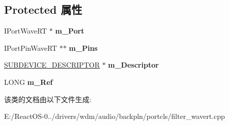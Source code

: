 \subsection*{Protected 属性}
\begin{DoxyCompactItemize}
\item 
\mbox{\label{class_c_port_filter_wave_r_t_ab103555c9e928d8d0c645bfbede5e2fc}} 
I\+Port\+Wave\+RT $\ast$ {\bfseries m\+\_\+\+Port}
\item 
\mbox{\label{class_c_port_filter_wave_r_t_a0356a06f89e7e1bb258ed621e23d286b}} 
I\+Port\+Pin\+Wave\+RT $\ast$$\ast$ {\bfseries m\+\_\+\+Pins}
\item 
\mbox{\label{class_c_port_filter_wave_r_t_a9205225d6b4d1f82cf39b3480043834c}} 
\hyperlink{struct_s_u_b_d_e_v_i_c_e___d_e_s_c_r_i_p_t_o_r}{S\+U\+B\+D\+E\+V\+I\+C\+E\+\_\+\+D\+E\+S\+C\+R\+I\+P\+T\+OR} $\ast$ {\bfseries m\+\_\+\+Descriptor}
\item 
\mbox{\label{class_c_port_filter_wave_r_t_a1fd971e5ff2aaba716573721285695c5}} 
L\+O\+NG {\bfseries m\+\_\+\+Ref}
\end{DoxyCompactItemize}


该类的文档由以下文件生成\+:\begin{DoxyCompactItemize}
\item 
E\+:/\+React\+O\+S-\/0../drivers/wdm/audio/backpln/portcls/filter\+\_\+wavert.\+cpp\end{DoxyCompactItemize}
